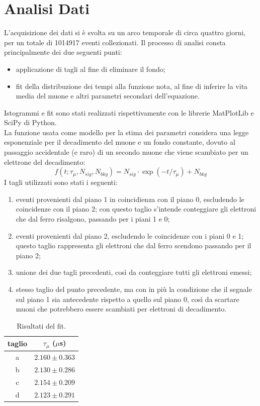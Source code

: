 \documentclass{standalone}
\begin{document}
\section{Analisi Dati}
L'acquisizione dei dati si \`e svolta su un arco temporale di circa quattro giorni, per un totale di 1014917 eventi collezionati. Il processo di analisi consta principalmente dei due seguenti punti:
\begin{itemize}
  \item applicazione di tagli al fine di eliminare il fondo;
  \item fit della distribuzione dei tempi alla funzione nota, al fine di inferire la vita media del muone e altri parametri secondari dell'equazione.
\end{itemize}
Istogrammi e fit sono stati realizzati rispettivamente con le librerie MatPlotLib e SciPy di Python. \\
La funzione usata come modello per la stima dei parametri considera una legge esponenziale per il decadimento del muone e un fondo constante, dovuto al passaggio accidentale (e raro) di un secondo muone che viene scambiato per un elettrone del decadimento:
\begin{equation}
  f(t;\tau_{\mu},N_{sig},N_{bkg}) = N_{sig} \cdot \exp{(-t / \tau_{\mu})} + N_{bkg}
  \label{eqn:simple_expo}
\end{equation}
I tagli utilizzati sono stati i seguenti:
\begin{enumerate}[label=(\alph*)]
  \item eventi provenienti dal piano 1 in coincidienza con il piano 0, escludendo le coincidenze con il piano 2; con questo taglio s'intende conteggiare gli elettroni che dal ferro risalgono, passando per i piani 1 e 0;
  \item eventi provenienti dal piano 2, escludendo le coincidenze con i piani 0 e 1; questo taglio rappresenta gli elettroni che dal ferro scendono passando per il piano 2;
  \item unione dei due tagli precedenti, cos\`i da conteggiare tutti gli elettroni emessi;
  \item stesso taglio del punto precedente, ma con in pi\`u la condizione che il segnale sul piano 1 sia antecedente rispetto a quello sul piano 0, cos\`i da scartare muoni che potrebbero essere scambiati per elettroni di decadimento.
\end{enumerate}

\begin{table}[!hbt]
  \centering
  \begin{tabular}{c|c}
    \hline
    \hline
    taglio & $\tau_{\mu}$ ($\mu$s) \\
    \hline
    \hline
    a & $2.160 \pm 0.363$ \\
    b & $2.130 \pm 0.286$ \\
    c & $2.154 \pm 0.209$ \\
    d & $2.123 \pm 0.291$ \\
    \hline
    \hline
  \end{tabular}
  \caption{Risultati del fit.}
  \label{tab:res_fit}
\end{table}
\end{document}

